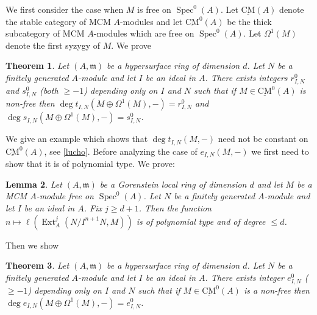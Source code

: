 \documentclass{amsart}
\newcommand{\m}{\mathfrak{m} }
\newcommand{\Spec}{\operatorname{Spec}}
\newcommand{\CMS}{\operatorname{\underline{CM}}}
\newcommand{\Ext}{\operatorname{Ext}}
\theoremstyle{plain}
\newtheorem{theorem}{Theorem}[section]
\newtheorem{lemma}[theorem]{Lemma}
\theoremstyle{definition}
\theoremstyle{remark}
\begin{document}
\s We first consider the case when $M$ is free on $\Spec^0(A)$. Let $\CMS(A)$ denote the stable category of MCM $A$-modules and let $\CMS^0(A)$ be the thick subcategory of MCM $A$-modules which are free on $\Spec^0(A)$. Let $\Omega^1(M)$ denote the first syzygy of $M$. We prove
\begin{theorem}\label{m1}
Let $(A,\m)$ be a hypersurface ring of dimension $d$. Let $N$ be a finitely generated $A$-module and let $I$ be an ideal in $A$.
 There exists integers $r_{I, N}^0$ and $s_{I, N}^0$ (both $\geq -1$) depending only on $I$ and $N$ such that if $M \in \CMS^0(A)$ is  non-free then
$\deg t_{I,N}(M \oplus \Omega^1(M), -) = r_{I, N}^0$ and $\deg s_{I,N}(M \oplus \Omega^1(M), -) = s_{I, N}^0$.
\end{theorem}
We give an example which shows that $\deg t_{I,N}(M, -) $ need not be constant on $\CMS^0(A)$, see \ref{lucho}. Before analyzing the case of $e_{I, N}(M, -)$ we first need to show that it is of polynomial type.
We prove:
\begin{lemma}
\label{e-growth} Let $(A,\m)$ be a Gorenstein local ring of dimension $d$ and let $M$ be a MCM $A$-module free on $\Spec^0(A)$. Let $N$ be a finitely generated $A$-module and let $I$ be an ideal in $A$. Fix $j \geq d +1$. Then the function $n \mapsto \ell(\Ext^{j}_A( N/I^{n+1}N, M))$ is of polynomial type and of degree $\leq d$.
\end{lemma}
Then we show
\begin{theorem}\label{m2}
Let $(A,\m)$ be a hypersurface ring of dimension $d$. Let $N$ be a finitely generated $A$-module and let $I$ be an ideal in $A$.
 There exists integer $e_{I, N}^0$ ($\geq -1$) depending only on $I$ and $N$ such that if $M \in \CMS^0(A)$ is a non-free then
$\deg e_{I,N}(M \oplus \Omega^1(M), -) = e_{I, N}^0$.
\end{theorem}
\end{document}
